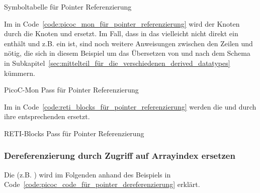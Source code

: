 \begin{code}
  \centering
  \caption{Symboltabelle für Pointer Referenzierung}
  \label{code:symboltabelle_für_pointer_referenzierung}
\end{code}

Im  in Code~\ref{code:picoc_mon_für_pointer_referenzierung} wird der Knoten  durch die Knoten  und  ersetzt. Im Fall, dass in  das  vielleicht nicht direkt ein  enthält und  z.B. ein  ist, sind noch weitere Anweisungen zwischen den Zeilen  und   nötig, die sich in diesem Beispiel um das Übersetzen von  und  nach dem Schema in Subkapitel~\ref{sec:mittelteil_für_die_verschiedenen_derived_datatypes} kümmern.

\begin{code}
  \centering
  \caption{PicoC-Mon Pass für Pointer Referenzierung}
  \label{code:picoc_mon_für_pointer_referenzierung}
\end{code}

Im  in Code~\ref{code:reti_blocks_für_pointer_referenzierung} werden die   und  durch ihre entsprechenden  ersetzt.

\begin{code}
  \centering
  \caption{RETI-Blocks Pass für Pointer Referenzierung}
  \label{code:reti_blocks_für_pointer_referenzierung}
\end{code}
\subsubsection{Dereferenzierung durch Zugriff auf Arrayindex ersetzen}
\label{dereferenzierung_durch_zugriff_auf_arrayindex_ersetzen}
Die  (z.B. ) wird im Folgenden anhand des Beispiels in Code~\ref{code:picoc_code_für_pointer_dereferenzierung} erklärt.

